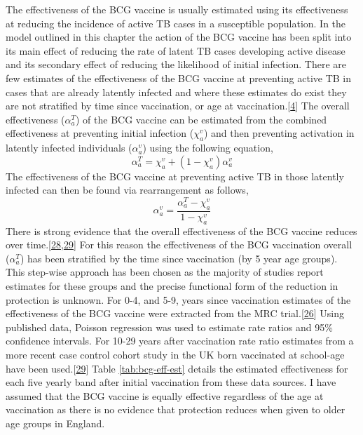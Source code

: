 \documentclass[11pt,twoside]{bristolthesis}
\begin{document}
  The effectiveness of the BCG vaccine is usually estimated using its effectiveness at reducing the incidence of active TB cases in a susceptible population. In the model outlined in this chapter the action of the BCG vaccine has been split into its main effect of reducing the rate of latent TB cases developing active disease and its secondary effect of reducing the likelihood of initial infection. There are few estimates of the effectiveness of the BCG vaccine at preventing active TB in cases that are already latently infected and where these estimates do exist they are not stratified by time since vaccination, or age at vaccination.{[}\protect\hyperlink{ref-Roy2014}{4}{]} The overall effectiveness (\(\alpha^T_a\)) of the BCG vaccine can be estimated from the combined effectiveness at preventing initial infection (\(\chi^v_a\)) and then preventing activation in latently infected individuals (\(\alpha^v_a\)) using the following equation,
  \begin{equation}
    \alpha^T_a = \chi^v_a + (1 - \chi^v_a) \alpha^v_a
    \label{eq:full-bcg-effectiveness}
  \end{equation}
  The effectiveness of the BCG vaccine at preventing active TB in those latently infected can then be found via rearrangement as follows,
  \begin{equation}
    \alpha^v_a = \frac{\alpha^T_a - \chi^v_a}{1 - \chi^v_a}
    \label{eq:latent-active-bcg-effectiveness}
  \end{equation}
  There is strong evidence that the overall effectiveness of the BCG vaccine reduces over time.{[}\protect\hyperlink{ref-Abubakar2013}{28},\protect\hyperlink{ref-Mangtani2017}{29}{]} For this reason the effectiveness of the BCG vaccination overall (\(\alpha^T_a\)) has been stratified by the time since vaccination (by 5 year age groups). This step-wise approach has been chosen as the majority of studies report estimates for these groups and the precise functional form of the reduction in protection is unknown. For 0-4, and 5-9, years since vaccination estimates of the effectiveness of the BCG vaccine were extracted from the MRC trial.{[}\protect\hyperlink{ref-Hart1972}{26}{]} Using published data, Poisson regression was used to estimate rate ratios and 95\% confidence intervals. For 10-29 years after vaccination rate ratio estimates from a more recent case control cohort study in the UK born vaccinated at school-age have been used.{[}\protect\hyperlink{ref-Mangtani2017}{29}{]} Table \ref{tab:bcg-eff-est} details the estimated effectiveness for each five yearly band after initial vaccination from these data sources. I have assumed that the BCG vaccine is equally effective regardless of the age at vaccination as there is no evidence that protection reduces when given to older age groups in England.
\end{document}
